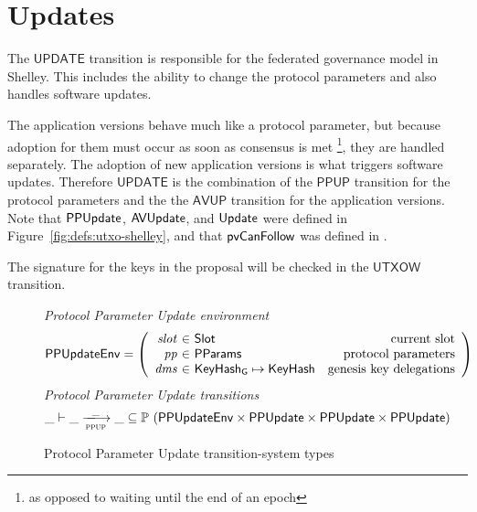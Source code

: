 \section{Updates}
\label{sec:update}


The $\mathsf{UPDATE}$ transition is responsible for the federated governance model in Shelley.
This includes the ability to change the protocol parameters and also handles software
updates.

The application versions behave much like a protocol parameter, but because adoption
for them must occur as soon as consensus is met
\footnote{as opposed to waiting until the end of an epoch},
they are handled separately.
The adoption of new application versions is what triggers software updates.
Therefore $\mathsf{UPDATE}$ is the combination of the
$\mathsf{PPUP}$ transition for the protocol parameters and the
the $\mathsf{AVUP}$ transition for the application versions.
Note that $\mathsf{PPUpdate}$, $\mathsf{AVUpdate}$, and $\mathsf{Update}$ were defined in
Figure~\ref{fig:defs:utxo-shelley}, and that $\mathsf{pvCanFollow}$
was defined in \cite{byron_ledger_spec}.


The signature for the keys in the proposal will be checked in the
$\mathsf{UTXOW}$ transition.


\begin{figure}[htb]
  \emph{Protocol Parameter Update environment}
  \begin{equation*}
    \PPUpdateEnv =
    \left(
      \begin{array}{r@{~\in~}lr}
        \var{slot} & \Slot & \text{current slot}\\
        \var{pp} & \PParams & \text{protocol parameters}\\
        \var{dms} & \KeyHashGen\mapsto\KeyHash & \text{genesis key delegations} \\
      \end{array}
    \right)
  \end{equation*}
  \emph{Protocol Parameter Update transitions}
  \begin{equation*}
    \_ \vdash
    \var{\_} \trans{ppup}{\_} \var{\_}
    \subseteq \powerset (\PPUpdateEnv \times \PPUpdate \times \PPUpdate \times \PPUpdate)
  \end{equation*}
  \caption{Protocol Parameter Update transition-system types}
  \label{fig:ts-types:pp-update}
\end{figure}

